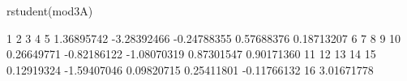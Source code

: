 \begin{Schunk}
\begin{Sinput}
 rstudent(mod3A)
\end{Sinput}
\begin{Soutput}
          1           2           3           4           5 
 1.36895742 -3.28392466 -0.24788355  0.57688376  0.18713207 
          6           7           8           9          10 
 0.26649771 -0.82186122 -1.08070319  0.87301547  0.90171360 
         11          12          13          14          15 
 0.12919324 -1.59407046  0.09820715  0.25411801 -0.11766132 
         16 
 3.01671778 
\end{Soutput}
\end{Schunk}
